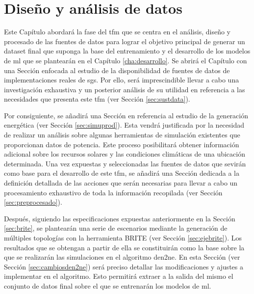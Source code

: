 \chapter{Diseño y análisis de datos}
\label{cha:analisis}

Este Capítulo abordará la fase del \gls{tfm} que se centra en el análisis, diseño y procesado de las fuentes de datos para lograr el objetivo principal de generar un dataset final que suponga la base del entrenamiento y el desarrollo de los modelos de \gls{ml} que se plantearán en el Capítulo \ref{cha:desarrollo}. Se abrirá el Capítulo con una Sección enfocada al estudio de la disponibilidad de fuentes de datos de implementaciones reales de \gls{sg}s. Por ello, será imprescindible llevar a cabo una investigación exhaustiva y un posterior análisis de su utilidad en referencia a las necesidades que presenta este \gls{tfm} (ver Sección \ref{sec:sustdata}).

\vspace{3mm}

Por consiguiente, se añadirá una Sección en referencia al estudio de la generación energética (ver Sección \ref{sec:simuprod}). Esta vendrá justificada por la necesidad de realizar un análisis sobre algunas herramientas de simulación existentes que proporcionan datos de potencia. Este proceso posibilitará obtener información adicional sobre los recursos solares y las condiciones climáticas de una ubicación determinada. Una vez expuestas y seleccionadas las fuentes de datos que sevirán como base para el desarrollo de este \gls{tfm}, se añadirá una Sección dedicada a la definición detallada de las acciones que serán necesarias para llevar a cabo un procesamiento exhaustivo de toda la información recopilada (ver Sección \ref{sec:preprocesado}). 

\vspace{3mm}

Después, siguiendo las especificaciones expuestas anteriormente en la Sección \ref{sec:brite}, se plantearán una serie de escenarios mediante la generación de múltiples topologías con la herramienta BRITE (ver Sección \ref{sec:ejebrite}). Los resultados que se obtengan a partir de ella se constituirán como la base sobre la que se realizarán las simulaciones en el algoritmo \gls{den2ne}. En esta Sección (ver Sección \ref{sec:cambiosden2ne}) será preciso detallar las modificaciones y ajustes a implementar en el algoritmo. Esto permitirá extraer a la salida del mismo el conjunto de datos final sobre el que se entrenarán los modelos de \gls{ml}.

